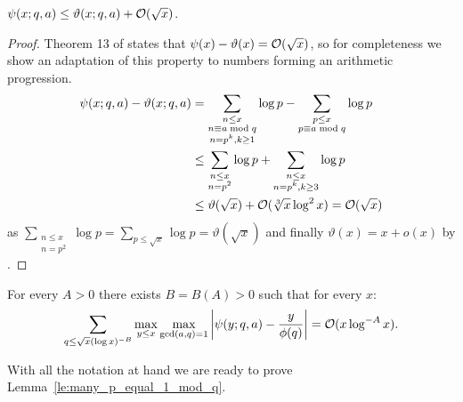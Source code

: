 \begin{fact}\label{fa:psi_vartheta}
$\psi(x;q,a) \leq \vartheta(x;q,a) + \mathcal{O}(\sqrt x)$.
\end{fact}
\begin{proof}
Theorem 13 of \cite{RosserS62} states that $\psi(x) - \vartheta(x) = \mathcal{O}(\sqrt x)$, so for completeness we show an adaptation of this property to numbers forming an arithmetic progression.
 \begin{align*}
  \psi(x;q,a) - \vartheta(x;q,a)&= \sum_{\substack{n \leq x \\ n \equiv a  \bmod q \\ n= p ^k, k\geq 1}} \log p - \sum_{\substack{p \leq x \\ p \equiv a  \bmod q }} \log p \\
  &\leq \sum_{\substack{n \leq x \\ n= p ^2}} \log p  + \sum_{\substack{n \leq x \\ n= p ^k, k\geq 3}} \log p\\  
  &\leq \vartheta(\sqrt x)+ \mathcal{O}(\sqrt[3]{x}\log^2x) = \mathcal{O}(\sqrt x)
 \end{align*}
as $\sum_{\substack{n \leq x \\ n= p ^2}} \log p  = \sum_{p\leq \sqrt x} \log p = \vartheta(\sqrt x) $ and finally  $\vartheta(x)= x+ o(x)$ by \cite[(2.29)]{RosserS62}.
\end{proof}

\begin{thm}\label{thm:bombieri}
For every $A>0$ there exists $B=B(A)>0$ such that for every $x$:
\[
\sum_{q\leq \sqrt{x}(\log x)^{-B}} \max_{y\leq x}\max_{\gcd(a,q)=1} \left| \psi(y;q,a) - \frac{y}{\phi(q)}\right| = \mathcal{O}(x\log^{-A} x). 
\]
\end{thm}
\noindent
With all the notation at hand we are ready to prove Lemma~\ref{le:many_p_equal_1_mod_q}.

